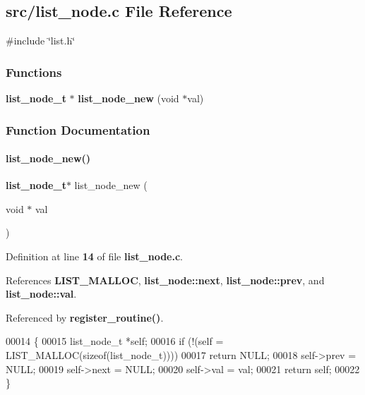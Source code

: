 \subsection{src/list\+\_\+node.c File Reference}
\label{a00116}
{\ttfamily \#include \char`\"{}list.\+h\char`\"{}}\newline
\subsubsection*{Functions}
\begin{DoxyCompactItemize}
\item 
\textbf{ list\+\_\+node\+\_\+t} $\ast$ \textbf{ list\+\_\+node\+\_\+new} (void $\ast$val)
\end{DoxyCompactItemize}


\subsubsection{Function Documentation}
\mbox{\label{a00116_a4ef36e0519514ac481d0d7e0b439d431}} 
\paragraph{list\+\_\+node\+\_\+new()}
{\footnotesize\ttfamily \textbf{ list\+\_\+node\+\_\+t}$\ast$ list\+\_\+node\+\_\+new (\begin{DoxyParamCaption}\item[{void $\ast$}]{val }\end{DoxyParamCaption})}



Definition at line \textbf{ 14} of file \textbf{ list\+\_\+node.\+c}.



References \textbf{ L\+I\+S\+T\+\_\+\+M\+A\+L\+L\+OC}, \textbf{ list\+\_\+node\+::next}, \textbf{ list\+\_\+node\+::prev}, and \textbf{ list\+\_\+node\+::val}.



Referenced by \textbf{ register\+\_\+routine()}.


\begin{DoxyCode}
00014                                       \{
00015   list_node_t *\textcolor{keyword}{self};
00016   \textcolor{keywordflow}{if} (!(\textcolor{keyword}{self} = LIST_MALLOC(\textcolor{keyword}{sizeof}(list_node_t))))
00017     \textcolor{keywordflow}{return} NULL;
00018   \textcolor{keyword}{self}->prev = NULL;
00019   \textcolor{keyword}{self}->next = NULL;
00020   \textcolor{keyword}{self}->val = val;
00021   \textcolor{keywordflow}{return} \textcolor{keyword}{self};
00022 \}
\end{DoxyCode}
